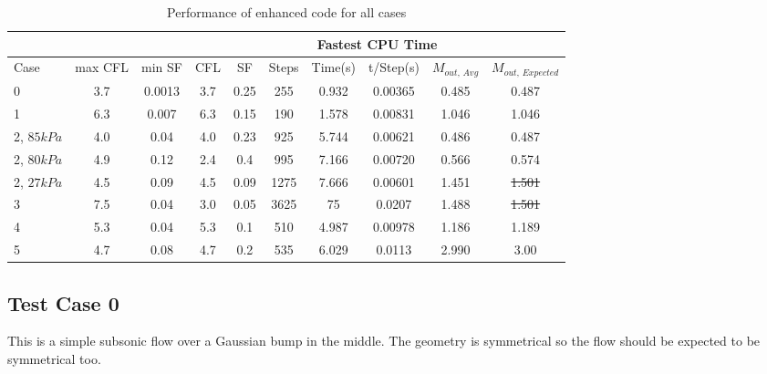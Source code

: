 \documentclass[12pt, a4paper]{article}
\begin{document}
\begin{table}[H]
	\captionsetup{justification=raggedright}
	\begin{adjustwidth}{-0.5in}{-0.5in}
	\centering
	\captionsetup[table]{justification=raggedright}
	\caption{Performance of enhanced code for all cases}
	\begin{tabular}{|l|c|c||c|c|c|c|c|c|c|} \hline
		&       &       & \multicolumn{7}{c|}{Fastest CPU Time} \\  \hline
		Case  & max CFL & min SF & CFL   & SF    & Steps & Time(s) & t/Step(s) & $M_{out,\, Avg}$ & $M_{out,\,Expected}$ \\ \hline
		0     & 3.7   & 0.0013 & 3.7   & 0.25  & 255   & 0.932 & 0.00365 & 0.485 & 0.487 \\ \hline
		1     & 6.3   & 0.007 & 6.3   & 0.15  & 190   & 1.578 & 0.00831 & 1.046 & 1.046 \\ \hline
		2, $85kPa$ & 4.0     & 0.04  & 4.0     & 0.23  & 925   & 5.744 & 0.00621 & 0.486 & 0.487 \\ \hline
		2, $80kPa$ & 4.9   & 0.12  & 2.4   & 0.4   & 995   & 7.166 & 0.00720 & 0.566 & 0.574 \\ \hline
		2, $27kPa$ & 4.5   & 0.09  & 4.5   & 0.09  & 1275  & 7.666 & 0.00601 & 1.451 & \sout{1.501} \\ \hline
		3     & 7.5   & 0.04  & 3.0     & 0.05  & 3625  & 75    & 0.0207 & 1.488 & \sout{1.501} \\ \hline
		4     & 5.3   & 0.04  & 5.3   & 0.1   & 510   & 4.987 & 0.00978 & 1.186 & 1.189 \\ \hline
		5     & 4.7   & 0.08  & 4.7   & 0.2   & 535   & 6.029 & 0.0113 & 2.990  & 3.00 \\ \hline
	\end{tabular}%
	\label{tab:enhance}%
	\end{adjustwidth}	
\end{table}%


\subsection{Test Case 0}
This is a simple subsonic flow over a Gaussian bump in the middle. The geometry is symmetrical so the flow should be expected to be symmetrical too. 
\end{document}
